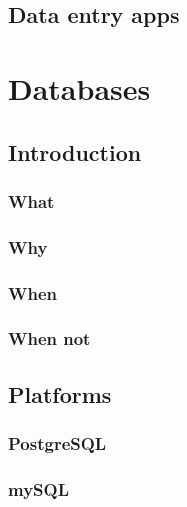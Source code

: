 \documentclass[
]{book}
\begin{document}
\hypertarget{data-entry-apps}{%
\chapter{Data entry apps}\label{data-entry-apps}}

\hypertarget{part-databases}{%
\part{Databases}\label{part-databases}}

\hypertarget{introduction-1}{%
\chapter{Introduction}\label{introduction-1}}

\hypertarget{what}{%
\section{What}\label{what}}

\hypertarget{why}{%
\section{Why}\label{why}}

\hypertarget{when}{%
\section{When}\label{when}}

\hypertarget{when-not}{%
\section{When not}\label{when-not}}

\hypertarget{platforms}{%
\chapter{Platforms}\label{platforms}}

\hypertarget{postgresql}{%
\section{PostgreSQL}\label{postgresql}}

\hypertarget{mysql}{%
\section{mySQL}\label{mysql}}
\end{document}
